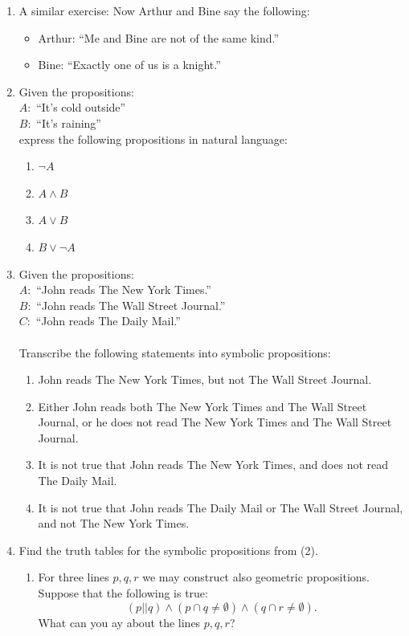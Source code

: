 \documentclass[11pt,paper=b5,footinclude,headinclude]{scrbook} %
\begin{document}
\begin{enumerate}
\item {A similar exercise:}
Now Arthur and Bine say the following:
\begin{itemize}
 \item Arthur: ``Me and Bine are not of the same kind.''
 \item Bine: ``Exactly one of us is a knight.''
\end{itemize}
\item Given the propositions:\\
$A:$ ``It's cold outside''\\
$B:$ ``It's raining''\\
express the following propositions in natural language:
\begin{enumerate}
\item $\neg A$
\item $A\wedge B$
\item $A\vee B$
\item $B\vee\neg A$
\end{enumerate}
\item Given the propositions:\\
$A:$ ``John reads The New York Times.''\\
$B:$ ``John reads The Wall Street Journal.''\\
$C:$ ``John reads The Daily Mail.''\\
\\
Transcribe the following statements into symbolic propositions:
\begin{enumerate}
\item John reads The New York Times, but not The Wall Street Journal.
\item Either John reads both The New York Times and The Wall Street Journal,
or he does not read The New York Times and The Wall Street Journal.
\item It is not true that John reads The New York Times, and does not read
The Daily Mail.
\item It is not true that John reads The Daily Mail or The Wall Street Journal,
and not The New York Times.
\end{enumerate}
\item Find the truth tables for the symbolic propositions from (2).
\begin{enumerate}
\item For three lines $p,q,r$ we may construct also geometric propositions.
Suppose that the following is true:
\[
(p||q)\wedge(p\cap q\neq\emptyset)\wedge(q\cap r\neq\emptyset).
\]
What can you ay about the lines $p,q,r$?

\end{enumerate}
\end{enumerate}
\end{document}
